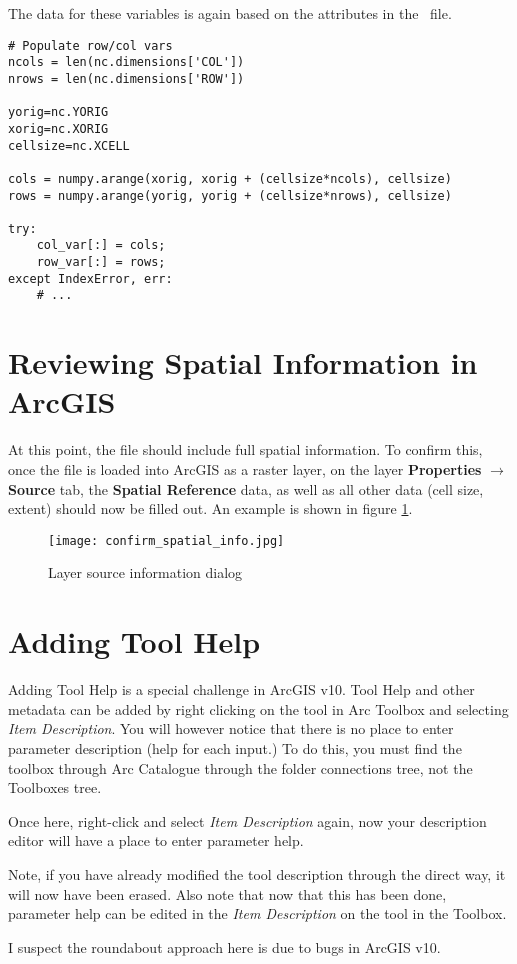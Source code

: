 The data for these variables is again based on the attributes in the
\ioapi~file.

\singlespace
\begin{verbatim}
# Populate row/col vars
ncols = len(nc.dimensions['COL'])
nrows = len(nc.dimensions['ROW'])

yorig=nc.YORIG
xorig=nc.XORIG
cellsize=nc.XCELL

cols = numpy.arange(xorig, xorig + (cellsize*ncols), cellsize)
rows = numpy.arange(yorig, yorig + (cellsize*nrows), cellsize)

try:
	col_var[:] = cols;
	row_var[:] = rows;
except IndexError, err:
	# ... 
\end{verbatim}
\doublespace

\section{Reviewing Spatial Information in ArcGIS}

At this point, the file should include full spatial information.  To confirm
this, once the file is loaded into ArcGIS as a raster layer, on the
layer \textbf{Properties} $\rightarrow$ \textbf{Source} tab, the
\textbf{Spatial Reference} data, as well as all other data (cell size,
extent) should now be filled out.  An example is shown in figure
\ref{confirm_spatial_info_ex}.

\begin{figure}
	\centering
	\texttt{[image: confirm\_spatial\_info.jpg]}
	\caption{Layer source information dialog}
	\label{confirm_spatial_info_ex}
\end{figure}

\section{Adding Tool Help}

Adding Tool Help is a special challenge in ArcGIS v10.  Tool Help and
other metadata can be added by right clicking on the tool in Arc
Toolbox and selecting \emph{Item Description}.  You will however
notice that there is no place to enter parameter description (help for
each input.)  To do this, you must find the toolbox through Arc
Catalogue through the folder connections tree, not the Toolboxes tree.

Once here, right-click and select \emph{Item Description} again, now
your description editor will have a place to enter parameter help.

Note, if you have already modified the tool description through the
direct way, it will now have been erased.  Also note that now that
this has been done, parameter help can be edited in the \emph{Item
Description} on the tool in the Toolbox.

I suspect the roundabout approach here is due to bugs in ArcGIS v10.
